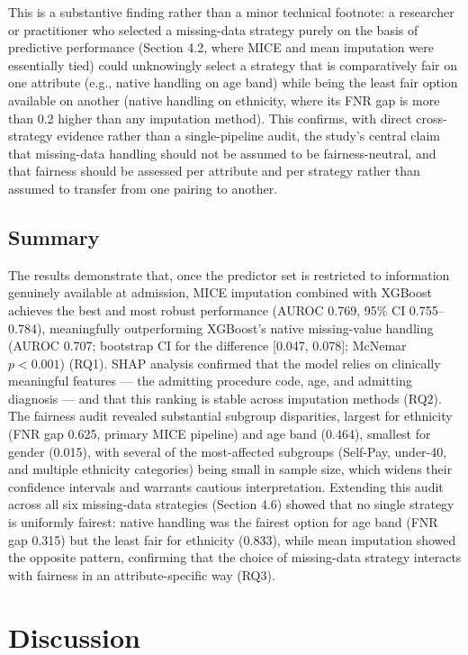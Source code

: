 \documentclass[12pt,a4paper]{report}
\begin{document}
This is a substantive finding rather than a minor technical footnote: a researcher or practitioner who selected a missing-data strategy purely on the basis of predictive performance (Section 4.2, where MICE and mean imputation were essentially tied) could unknowingly select a strategy that is comparatively fair on one attribute (e.g., native handling on age band) while being the least fair option available on another (native handling on ethnicity, where its FNR gap is more than 0.2 higher than any imputation method). This confirms, with direct cross-strategy evidence rather than a single-pipeline audit, the study's central claim that missing-data handling should not be assumed to be fairness-neutral, and that fairness should be assessed per attribute and per strategy rather than assumed to transfer from one pairing to another.


\section{Summary}
The results demonstrate that, once the predictor set is restricted to information genuinely available at admission, MICE imputation combined with XGBoost achieves the best and most robust performance (AUROC 0.769, 95\% CI 0.755--0.784), meaningfully outperforming XGBoost's native missing-value handling (AUROC 0.707; bootstrap CI for the difference [0.047, 0.078]; McNemar $p<0.001$) (RQ1). SHAP analysis confirmed that the model relies on clinically meaningful features --- the admitting procedure code, age, and admitting diagnosis --- and that this ranking is stable across imputation methods (RQ2). The fairness audit revealed substantial subgroup disparities, largest for ethnicity (FNR gap 0.625, primary MICE pipeline) and age band (0.464), smallest for gender (0.015), with several of the most-affected subgroups (Self-Pay, under-40, and multiple ethnicity categories) being small in sample size, which widens their confidence intervals and warrants cautious interpretation. Extending this audit across all six missing-data strategies (Section 4.6) showed that no single strategy is uniformly fairest: native handling was the fairest option for age band (FNR gap 0.315) but the least fair for ethnicity (0.833), while mean imputation showed the opposite pattern, confirming that the choice of missing-data strategy interacts with fairness in an attribute-specific way (RQ3).


\chapter{Discussion}
\end{document}

